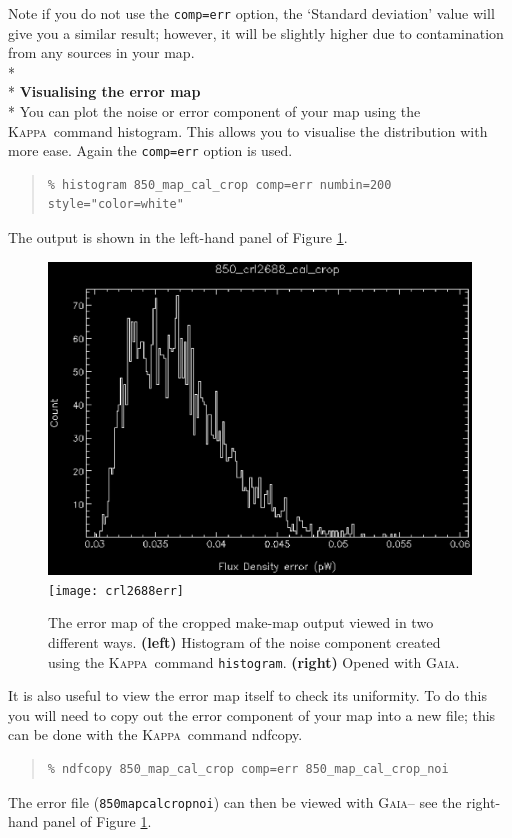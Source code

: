 \documentclass[twoside,11pt]{article}
\newcommand{\xref}[3]{#1}
\renewcommand{\_}{\texttt{\symbol{95}}}
\newenvironment{myquote}{\begin{quote}\begin{small}}{\end{small}\end{quote}}
\newcommand{\Kappa}{\xref{\textsc{Kappa}}{sun95}{}}
\newcommand{\gaia}{\xref{\textsc{Gaia}}{sun214}{}}
\newcommand{\task}[1]{\textsf{#1}}
\newcommand{\param}[1]{\texttt{#1}}
\newcommand{\ndfcopy}{\xref{\task{ndfcopy}}{sun95}{NDFCOPY}}
\newcommand{\histogram}{\xref{\task{histogram}}{sun95}{HISTOGRAM}}
\begin{document}
Note if you do not use the \param{comp=err} option, the `Standard deviation' value will give you a similar result; however, it will be slightly higher due to contamination from any sources in your map.
\\*\\*
\textbf{Visualising the error map}\\*
You can plot the noise or error component of your map using the \Kappa\ command \histogram. This allows you to visualise the distribution with more ease. Again the \param{comp=err} option is used.
\begin{myquote}
\begin{verbatim}
% histogram 850_map_cal_crop comp=err numbin=200  style="color=white"
\end{verbatim}
\end{myquote}
The output is shown in the left-hand panel of Figure \ref{fig:noi}.
\begin{figure}
\begin{center}
\includegraphics[width=0.53\linewidth]{noihist}
\texttt{[image: crl2688\_err]}
\caption{\small The error map of the cropped make-map output viewed in two different ways. \textbf{(left)} Histogram of the noise component created using the \Kappa\  command \texttt{histogram}. \textbf{(right)} Opened with \gaia.}
\label{fig:noi}
\end{center}
\end{figure}

It is also useful to view the error map itself to check its uniformity. To do this you will need to copy out the error component of your map into a new file; this can be done with the \Kappa\ command \ndfcopy.
\begin{myquote}
\begin{verbatim}
% ndfcopy 850_map_cal_crop comp=err 850_map_cal_crop_noi
\end{verbatim}
\end{myquote}
The error file (\texttt{850\_map\_cal\_crop\_noi}) can then be viewed with \gaia -- see the right-hand panel of Figure \ref{fig:noi}.
\end{document}
